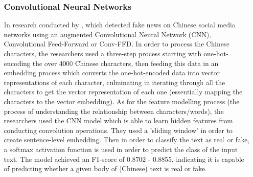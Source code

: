 \documentclass[stu,12pt,floatsintext,donotrepeattitle]{apa7}
\begin{document}
\subsubsection{Convolutional Neural Networks}
In research conducted by \textcite{cnn_chinese}, which detected fake news on Chinese social media networks using an augmented Convolutional Neural Network (CNN), Convolutional Feed-Forward or Conv-FFD. In order to process the Chinese characters, the researchers used a three-step process starting with one-hot-encoding the over 4000 Chinese characters, then feeding this data in an embedding process which converts the one-hot-encoded data into vector representations of each character, culminating in iterating through all the characters to get the vector representation of each one (essentially mapping the characters to the vector embedding). As for the feature modelling process (the process of understanding the relationship between characters/words), the researchers used the CNN model which is able to learn hidden features from conducting convolution operations. They used a 'sliding window' in order to create sentence-level embedding. Then in order to classify the text as real or fake, a softmax activation function is used in order to predict the class of the input text. The model achieved an F1-score of 0.8702 - 0.8855, indicating it is capable of predicting whether a given body of (Chinese) text is real or fake. 
\end{document}
